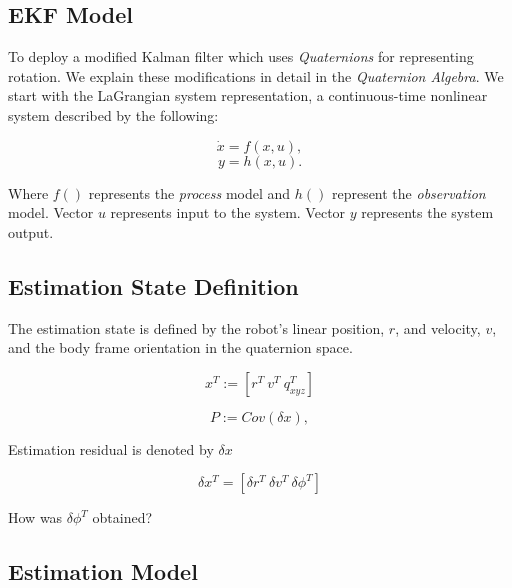 \documentclass[letterpaper, 10 pt, conference]{ieeeconf}  %
\newcommand{\transpose}[1]{\ensuremath{#1^{\scriptscriptstyle T}}}
\begin{document}
\subsection{EKF Model}

To deploy a modified Kalman filter which uses \textit{Quaternions} for representing
rotation. We explain these modifications in detail in the \textit{Quaternion Algebra}.
We start with the LaGrangian system representation, a continuous-time nonlinear
system described by the following:

\begin{equation} \label{eq:6}
\dot{x} = f(x,u),
\end{equation}
\begin{equation} \label{eq:7}
y = h(x,u).
\end{equation}

Where $f()$ represents the \textit{process} model and $h()$ represent the
\textit{observation} model.
Vector $u$ represents input to the system.
Vector $y$ represents the system output.


\subsection{Estimation State Definition}

The estimation state is defined by the robot's linear position, $r$, and velocity,
$v$, and the body frame orientation in the quaternion space.

\begin{equation}
\label{eq:8}
\transpose{x} :=  \left[\transpose{r}~\transpose{v}~\transpose{q_{xyz}} \right]
\end{equation}

\begin{equation}
\label{eq:9}
P := Cov(\delta x),
\end{equation}

Estimation residual is denoted by $\delta x$


\begin{equation}
\label{eq:10}
\delta \transpose{x} = \left[\transpose{\delta r} ~\transpose{\delta v} ~\transpose{\delta \phi} \right]
\end{equation}

How was $ \transpose{\delta \phi} $ obtained?


\subsection{Estimation Model}
\end{document}
